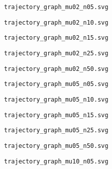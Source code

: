 \documentclass{article}
\begin{document}
\verb|trajectory_graph_mu02_n05.svg|
\begin{figure}[t]
\centering

\vskip-8pt
\end{figure}
\newpage
\verb|trajectory_graph_mu02_n10.svg|
\begin{figure}[t]
\centering

\vskip-8pt
\end{figure}
\newpage
\verb|trajectory_graph_mu02_n15.svg|
\begin{figure}[t]
\centering

\vskip-8pt
\end{figure}
\newpage
\verb|trajectory_graph_mu02_n25.svg|
\begin{figure}[t]
\centering

\vskip-8pt
\end{figure}
\newpage
\verb|trajectory_graph_mu02_n50.svg|
\begin{figure}[t]
\centering

\vskip-8pt
\end{figure}
\newpage
\verb|trajectory_graph_mu05_n05.svg|
\begin{figure}[t]
\centering

\vskip-8pt
\end{figure}
\newpage
\verb|trajectory_graph_mu05_n10.svg|
\begin{figure}[t]
\centering

\vskip-8pt
\end{figure}
\newpage
\verb|trajectory_graph_mu05_n15.svg|
\begin{figure}[t]
\centering

\vskip-8pt
\end{figure}
\newpage
\verb|trajectory_graph_mu05_n25.svg|
\begin{figure}[t]
\centering

\vskip-8pt
\end{figure}
\newpage
\verb|trajectory_graph_mu05_n50.svg|
\begin{figure}[t]
\centering

\vskip-8pt
\end{figure}
\newpage
\verb|trajectory_graph_mu10_n05.svg|
\end{document}
